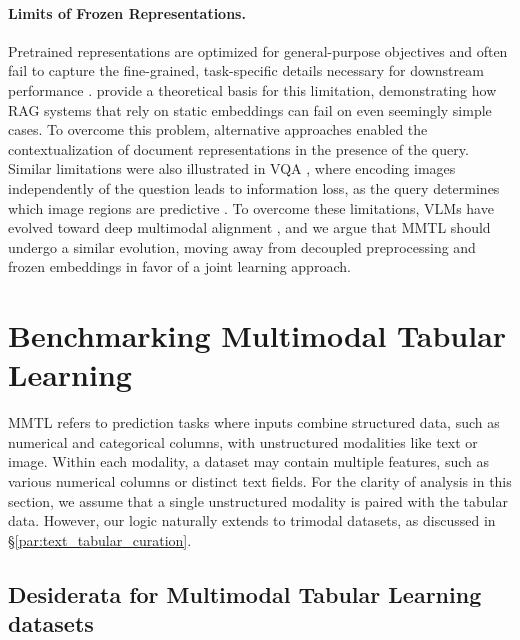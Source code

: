 \documentclass{article}
\begin{document}
\paragraph{Limits of Frozen Representations.} 
Pretrained representations are optimized for general-purpose objectives and often fail to capture the fine-grained, task-specific details necessary for downstream performance \cite{tong_eyes_2024, liu_data_2025, gisserot-boukhlef_should_2025, cao_tipsv2_2026}. \citet{weller_theoretical_2025} provide a theoretical basis for this limitation, demonstrating how RAG systems \cite{lewis_retrieval-augmented_nodate} that rely on static embeddings can fail on even seemingly simple cases. To overcome this problem, alternative approaches \cite{khattab_colbert_2020, malaviya_quest_2023, fan_survey_2024, tang_we_2024, edge_local_2025, wang_jina-reranker-v3_2025, pu_customized_2025, koshorek_structured_2025, hoffer2026retrievalwithinintrinsiccapability} enabled the contextualization of document representations in the presence of the query. Similar limitations were also illustrated in VQA \cite{antol_vqa_2015}, where encoding images independently of the question leads to information loss, as the query determines which image regions are predictive \cite{ganz_question_2024, li_lost_2025}. To overcome these limitations, VLMs have evolved toward deep multimodal alignment \cite{radford_learning_2021, alayrac_flamingo_2022, liu_visual_2023}, and we argue that MMTL should undergo a similar evolution, moving away from decoupled preprocessing and frozen embeddings in favor of a joint learning approach.

\section{Benchmarking Multimodal Tabular Learning}\label{sec:benchmarking}

MMTL \cite{jiang_representation_2026, kim_multimodalpfn_2025} refers to prediction tasks where inputs combine structured data, such as numerical and categorical columns, with unstructured modalities like text or image. Within each modality, a dataset may contain multiple features, such as various numerical columns or distinct text fields. For the clarity of analysis in this section, we assume that a single unstructured modality is paired with the tabular data. However, our logic naturally extends to trimodal datasets, as discussed in \S\ref{par:text_tabular_curation}.


\subsection{Desiderata for Multimodal Tabular Learning datasets}
\label{sec:benchmark_desiderata}
\end{document}

